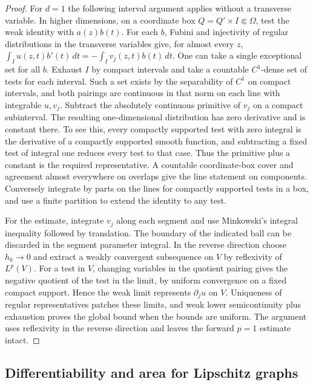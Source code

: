 \documentclass[11pt,oneside,openany]{book}
\theoremstyle{definition}
\theoremstyle{remark}
\begin{document}
\begin{proof}
For \(d=1\) the following interval argument applies without a transverse variable. In higher dimensions, on a coordinate box \(Q=Q'\times I\Subset\Omega\), test the weak identity with \(a(z)b(t)\). For each \(b\), Fubini and injectivity of regular distributions in the transverse variables give, for almost every \(z\),
\(\int_I u(z,t)b'(t)\,dt=-\int_I v_j(z,t)b(t)\,dt\).
One can take a single exceptional set for all \(b\). Exhaust \(I\) by compact intervals and take a countable \(C^1\)-dense set of tests for each interval. Such a set exists by the separability of \(C^1\) on compact intervals, and both pairings are continuous in that norm on each line with integrable \(u,v_j\). Subtract the absolutely continuous primitive of \(v_j\) on a compact subinterval. The resulting one-dimensional distribution has zero derivative and is constant there. To see this, every compactly supported test with zero integral is the derivative of a compactly supported smooth function, and subtracting a fixed test of integral one reduces every test to that case. Thus the primitive plus a constant is the required representative. A countable coordinate-box cover and agreement almost everywhere on overlaps give the line statement on components. Conversely integrate by parts on the lines for compactly supported tests in a box, and use a finite partition to extend the identity to any test.

For the estimate, integrate \(v_j\) along each segment and use Minkowski's integral inequality followed by translation. The boundary of the indicated ball can be discarded in the segment parameter integral. In the reverse direction choose \(h_k\to0\) and extract a weakly convergent subsequence on \(V\) by reflexivity of \(L^p(V)\). For a test in \(V\), changing variables in the quotient pairing gives the negative quotient of the test in the limit, by uniform convergence on a fixed compact support. Hence the weak limit represents \(\partial_j u\) on \(V\). Uniqueness of regular representatives patches these limits, and weak lower semicontinuity plus exhaustion proves the global bound when the bounds are uniform. The argument uses reflexivity in the reverse direction and leaves the forward \(p=1\) estimate intact.
\end{proof}

\subsection{Differentiability and area for Lipschitz graphs}
\end{document}
